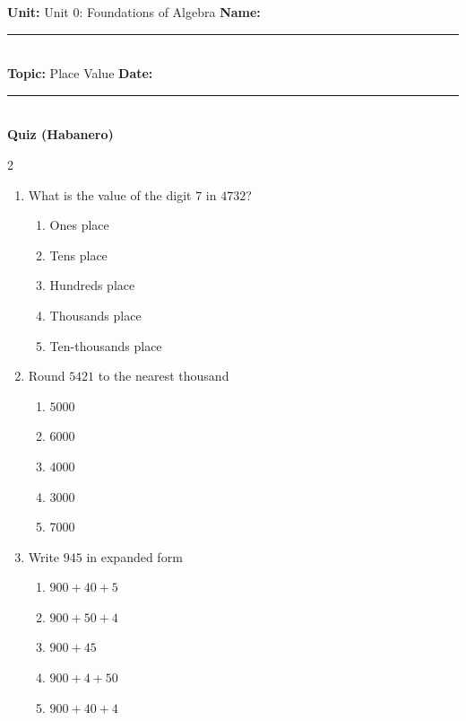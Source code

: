 \documentclass[10pt]{article}
\begin{document}
\enlargethispage{2.5cm}

\begin{tcolorbox}[colback=mainblue!5, colframe=mainblue, sharp corners, boxrule=0.5pt]
    \small \textbf{Unit:} Unit 0: Foundations of Algebra \hfill \textbf{Name:} \rule{3cm}{0.4pt} \\
    \small \textbf{Topic:} Place Value \hfill \textbf{Date:} \rule{2cm}{0.4pt} \\
    \centering \textbf{\large Quiz (Habanero)}
\end{tcolorbox}

\vspace{0.2cm}

\begin{multicols}{2}
\begin{enumerate}[label=\textbf{Q\arabic*.}, leftmargin=*, itemsep=6pt, parsep=0pt]

  \item \small What is the value of the digit $7$ in $4732$?
  \begin{enumerate}[label=(\Alph*), leftmargin=0.6cm, nosep, itemsep=2pt]
    \item Ones place
    \item Tens place
    \item Hundreds place
    \item Thousands place
    \item Ten-thousands place
  \end{enumerate}

  \item \small Round $5421$ to the nearest thousand
  \begin{enumerate}[label=(\Alph*), leftmargin=0.6cm, nosep, itemsep=2pt]
    \item $5000$
    \item $6000$
    \item $4000$
    \item $3000$
    \item $7000$
  \end{enumerate}

  \item \small Write $945$ in expanded form
  \begin{enumerate}[label=(\Alph*), leftmargin=0.6cm, nosep, itemsep=2pt]
    \item $900 + 40 + 5$
    \item $900 + 50 + 4$
    \item $900 + 45$
    \item $900 + 4 + 50$
    \item $900 + 40 + 4$
  \end{enumerate}


\end{enumerate}
\end{multicols}
\end{document}
